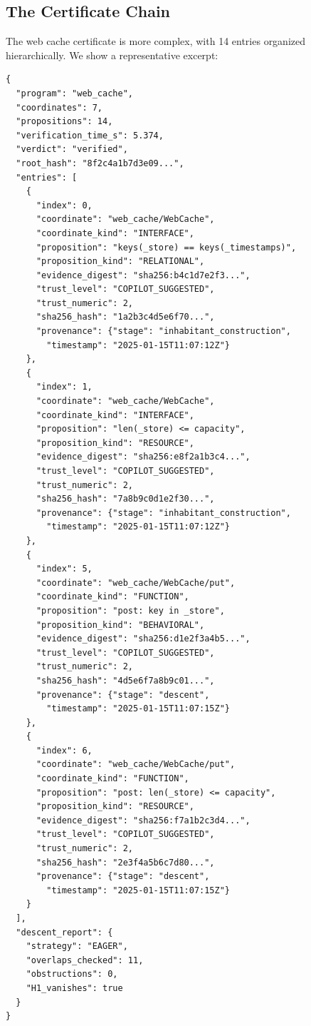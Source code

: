 \documentclass[11pt]{article}
\begin{document}
\subsection{The Certificate Chain}

The web cache certificate is more complex, with 14 entries organized
hierarchically.  We show a representative excerpt:

\begin{lstlisting}[style=jugeo-output,caption={Certificate chain excerpt for web cache.}]
{
  "program": "web_cache",
  "coordinates": 7,
  "propositions": 14,
  "verification_time_s": 5.374,
  "verdict": "verified",
  "root_hash": "8f2c4a1b7d3e09...",
  "entries": [
    {
      "index": 0,
      "coordinate": "web_cache/WebCache",
      "coordinate_kind": "INTERFACE",
      "proposition": "keys(_store) == keys(_timestamps)",
      "proposition_kind": "RELATIONAL",
      "evidence_digest": "sha256:b4c1d7e2f3...",
      "trust_level": "COPILOT_SUGGESTED",
      "trust_numeric": 2,
      "sha256_hash": "1a2b3c4d5e6f70...",
      "provenance": {"stage": "inhabitant_construction",
        "timestamp": "2025-01-15T11:07:12Z"}
    },
    {
      "index": 1,
      "coordinate": "web_cache/WebCache",
      "coordinate_kind": "INTERFACE",
      "proposition": "len(_store) <= capacity",
      "proposition_kind": "RESOURCE",
      "evidence_digest": "sha256:e8f2a1b3c4...",
      "trust_level": "COPILOT_SUGGESTED",
      "trust_numeric": 2,
      "sha256_hash": "7a8b9c0d1e2f30...",
      "provenance": {"stage": "inhabitant_construction",
        "timestamp": "2025-01-15T11:07:12Z"}
    },
    {
      "index": 5,
      "coordinate": "web_cache/WebCache/put",
      "coordinate_kind": "FUNCTION",
      "proposition": "post: key in _store",
      "proposition_kind": "BEHAVIORAL",
      "evidence_digest": "sha256:d1e2f3a4b5...",
      "trust_level": "COPILOT_SUGGESTED",
      "trust_numeric": 2,
      "sha256_hash": "4d5e6f7a8b9c01...",
      "provenance": {"stage": "descent",
        "timestamp": "2025-01-15T11:07:15Z"}
    },
    {
      "index": 6,
      "coordinate": "web_cache/WebCache/put",
      "coordinate_kind": "FUNCTION",
      "proposition": "post: len(_store) <= capacity",
      "proposition_kind": "RESOURCE",
      "evidence_digest": "sha256:f7a1b2c3d4...",
      "trust_level": "COPILOT_SUGGESTED",
      "trust_numeric": 2,
      "sha256_hash": "2e3f4a5b6c7d80...",
      "provenance": {"stage": "descent",
        "timestamp": "2025-01-15T11:07:15Z"}
    }
  ],
  "descent_report": {
    "strategy": "EAGER",
    "overlaps_checked": 11,
    "obstructions": 0,
    "H1_vanishes": true
  }
}
\end{lstlisting}
\end{document}
